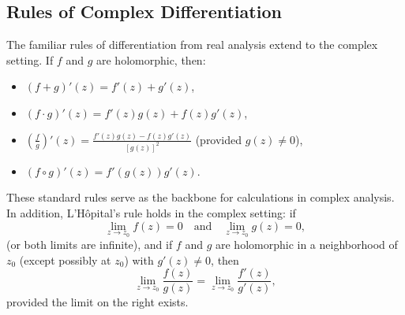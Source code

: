 \subsection*{Rules of Complex Differentiation}

\noindent The familiar rules of differentiation from real analysis extend to the complex setting. If \(f\) and \(g\) are holomorphic, then:
\begin{itemize}
    \item \(\displaystyle (f+g)'(z) = f'(z)+g'(z)\),
    \item \(\displaystyle (f\cdot g)'(z) = f'(z)g(z)+f(z)g'(z)\),
    \item \(\displaystyle \left(\frac{f}{g}\right)'(z) = \frac{f'(z)g(z)-f(z)g'(z)}{[g(z)]^2}\) (provided \(g(z)\neq 0\)),
    \item \(\displaystyle (f\circ g)'(z) = f'(g(z))g'(z)\).
\end{itemize}
These standard rules serve as the backbone for calculations in complex analysis. In addition, L'Hôpital's rule holds in the complex setting: if 
\[
\lim_{z\to z_0}f(z)=0 \quad \text{and} \quad \lim_{z\to z_0}g(z)=0,
\]
(or both limits are infinite), and if \(f\) and \(g\) are holomorphic in a neighborhood of \(z_0\) (except possibly at \(z_0\)) with \(g'(z)\neq 0\), then
\[
\lim_{z\to z_0}\frac{f(z)}{g(z)}=\lim_{z\to z_0}\frac{f'(z)}{g'(z)},
\]
provided the limit on the right exists.

